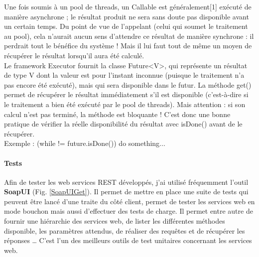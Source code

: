 \begin{itemize}
Une fois soumis à un pool de threads, un Callable est généralement[1] exécuté de manière asynchrone ; le résultat produit ne sera sans doute pas disponible avant un certain temps.
Du point de vue de l'appelant (celui qui soumet le traitement au pool), cela n'aurait aucun sens d'attendre ce résultat de manière synchrone : il perdrait tout le bénéfice du système ! Mais il lui faut tout de même un moyen de récupérer le résultat lorsqu'il aura été calculé.\\

Le framework \og Executor \fg fournit la classe Future<V>, qui représente un résultat de type V dont la valeur est pour l'instant inconnue (puisque le traitement n'a pas encore été exécuté), mais qui sera disponible dans le futur. 
La méthode get() permet de récupérer le résultat immédiatement s'il est disponible (c'est-à-dire si le traitement a bien été exécuté par le pool de threads). Mais attention : si son calcul n'est pas terminé, la méthode est bloquante ! C'est donc une bonne pratique de vérifier la réelle disponibilité du résultat avec isDone() avant de le récupérer. \\

Exemple : (while != future.isDone()) do something...\\

\paragraph{Tests}

Afin de tester les web services REST développés, j'ai utilisé fréquemment l'outil \textbf{SoapUI} (Fig. \ref{SoapUIGet}). Il permet de mettre en place une suite de tests qui peuvent être lancé d'une traite du côté client, permet de tester les services web en mode bouchon mais aussi d'effectuer des tests de charge. Il permet entre autre de fournir une hiérarchie des services web, de lister les différentes méthodes disponible, les paramètres attendus, de réaliser des requêtes et de récupérer les réponses … C'est l'un des meilleurs outils de test unitaires concernant les services web.\\


\end{itemize}
